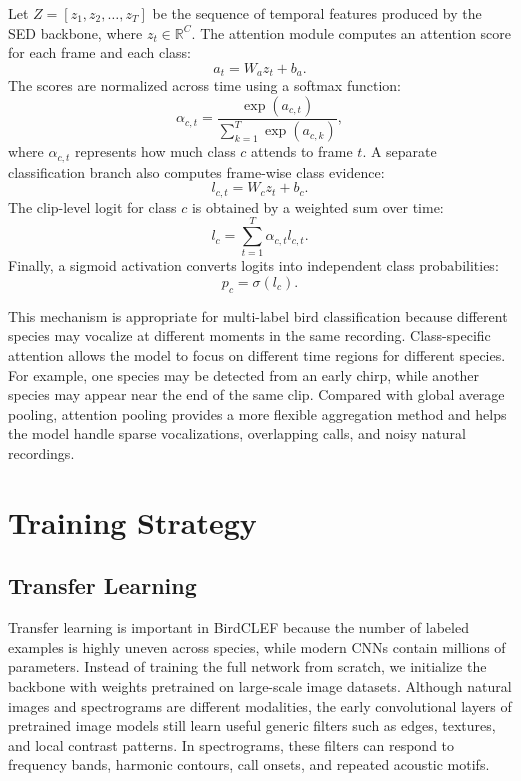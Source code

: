\documentclass[a4paper,12pt]{article}
\begin{document}
Let $Z = [z_1, z_2, \ldots, z_T]$ be the sequence of temporal features produced by the SED backbone, where $z_t \in \mathbb{R}^{C}$. The attention module computes an attention score for each frame and each class:
\[
a_t = W_a z_t + b_a.
\]
The scores are normalized across time using a softmax function:
\[
\alpha_{c,t} = \frac{\exp(a_{c,t})}{\sum_{k=1}^{T} \exp(a_{c,k})},
\]
where $\alpha_{c,t}$ represents how much class $c$ attends to frame $t$. A separate classification branch also computes frame-wise class evidence:
\[
l_{c,t} = W_c z_t + b_c.
\]
The clip-level logit for class $c$ is obtained by a weighted sum over time:
\[
l_c = \sum_{t=1}^{T} \alpha_{c,t} l_{c,t}.
\]
Finally, a sigmoid activation converts logits into independent class probabilities:
\[
p_c = \sigma(l_c).
\]

This mechanism is appropriate for multi-label bird classification because different species may vocalize at different moments in the same recording. Class-specific attention allows the model to focus on different time regions for different species. For example, one species may be detected from an early chirp, while another species may appear near the end of the same clip. Compared with global average pooling, attention pooling provides a more flexible aggregation method and helps the model handle sparse vocalizations, overlapping calls, and noisy natural recordings.

\section{Training Strategy}

\subsection{Transfer Learning}

Transfer learning is important in BirdCLEF because the number of labeled examples is highly uneven across species, while modern CNNs contain millions of parameters. Instead of training the full network from scratch, we initialize the backbone with weights pretrained on large-scale image datasets. Although natural images and spectrograms are different modalities, the early convolutional layers of pretrained image models still learn useful generic filters such as edges, textures, and local contrast patterns. In spectrograms, these filters can respond to frequency bands, harmonic contours, call onsets, and repeated acoustic motifs.
\end{document}
